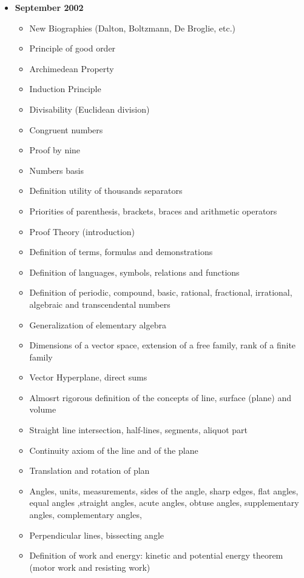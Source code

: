 \documentclass[12pt,a4paper,twoside,openright]{report}
\newcounter{def}
\theoremstyle{definition}
\theoremstyle{itexmp}
\numberwithin{equation}{section}
\begin{document}
\begin{itemize}
\begin{itemize}[noitemsep]
			\end{itemize}
		\item \textbf{September 2002}	
			\begin{itemize}[noitemsep]
				\item New Biographies (Dalton, Boltzmann, De Broglie, etc.)
				\item Principle of good order
				\item Archimedean Property
				\item Induction Principle
				\item Divisability (Euclidean division)
				\item Congruent numbers
				\item Proof by nine
				\item Numbers basis
				\item Definition utility of thousands separators
				\item Priorities of parenthesis, brackets, braces and arithmetic operators
				\item Proof Theory (introduction)
				\item Definition of terms, formulas and demonstrations
				\item Definition of languages, symbols, relations and functions
				\item Definition of periodic, compound, basic, rational, fractional, irrational, algebraic and transcendental numbers
				\item Generalization of elementary algebra
				\item Dimensions of a vector space, extension of a free family, rank of a finite family
				\item Vector Hyperplane, direct sums
				\item Almosrt rigorous definition of the concepts of line, surface (plane) and volume
				\item Straight line intersection, half-lines, segments, aliquot part
				\item Continuity axiom of the line and of the plane
				\item Translation and rotation of plan
				\item Angles, units, measurements, sides of the angle, sharp edges, flat angles, equal angles ,straight angles, acute angles, obtuse angles, supplementary angles, complementary angles, 
				\item Perpendicular lines, bissecting angle
				\item Definition of work and energy: kinetic and potential energy theorem (motor work and resisting work)

\end{itemize}
\end{itemize}
\end{document}
